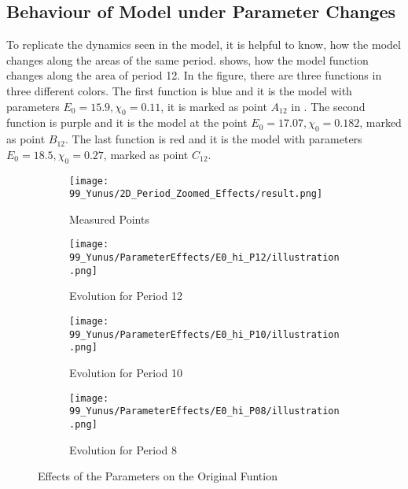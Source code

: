 \subsection{Behaviour of Model under Parameter Changes}
\label{sec:og.param.effects}

To replicate the dynamics seen in the model, it is helpful to know, how the model changes along the areas of the same period.
 shows, how the model function changes along the area of period 12.
In the figure, there are three functions in three different colors.
The first function is blue and it is the model with parameters $E_0 = 15.9, \chi_0 = 0.11$, it is marked as point $A_12$ in .
The second function is purple and it is the model at the point $E_0 = 17.07, \chi_0 = 0.182$, marked as point $B_{12}$.
The last function is red and it is the model with parameters $E_0 = 18.5, \chi_0 = 0.27$, marked as point $C_{12}$.

\begin{figure}
    \centering
    \begin{subfigure}{0.4\textwidth}
        \texttt{[image: 99\_Yunus/2D\_Period\_Zoomed\_Effects/result.png]}
        \caption{Measured Points}
        \label{fig:yunus.function.evolution.map}
    \end{subfigure}
    \begin{subfigure}{0.4\textwidth}
        \texttt{[image: 99\_Yunus/ParameterEffects/E0\_hi\_P12/illustration.png]}
        \caption{Evolution for Period 12}
        \label{fig:yunus.function.evolution.12}
    \end{subfigure}
    \begin{subfigure}{0.4\textwidth}
        \texttt{[image: 99\_Yunus/ParameterEffects/E0\_hi\_P10/illustration.png]}
        \caption{Evolution for Period 10}
        \label{fig:yunus.function.evolution.10}
    \end{subfigure}
    \begin{subfigure}{0.4\textwidth}
        \texttt{[image: 99\_Yunus/ParameterEffects/E0\_hi\_P08/illustration.png]}
        \caption{Evolution for Period 8}
        \label{fig:yunus.function.evolution.08}
    \end{subfigure}
    \caption{Effects of the Parameters on the Original Funtion}
\end{figure}

